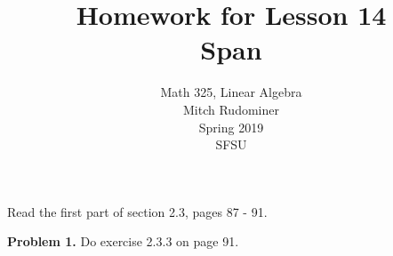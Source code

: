 \documentclass[oneside,12pt]{amsart}
\begin{document}
\title{Homework for Lesson 14 \\ Span}
\author{Math 325, Linear Algebra \\ Mitch Rudominer \\ Spring 2019\\ SFSU }
\date{}

\maketitle

Read the first part of section 2.3, pages 87 - 91.

\bigskip


\textbf{Problem 1.} Do exercise 2.3.3 on page 91.
\end{document}
